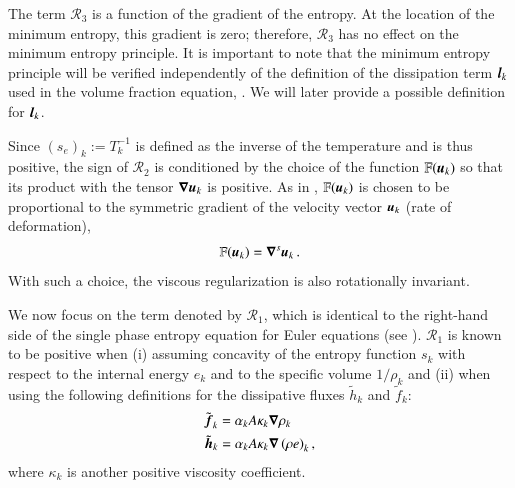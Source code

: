 \documentclass[preprint,10pt]{elsarticle}
\begin{document}
The term ${\mathcal{R}_3}$ is a function of the gradient of the entropy.  
At the location of the minimum entropy, this gradient is zero; therefore, $\mathcal{R}_3$ 
has no effect on the minimum entropy principle. It is important to note that the minimum entropy principle will be verified
independently of the definition of the dissipation term $\boldsymbol l_k$ used in the volume fraction
equation, . We will later provide a possible definition for $\boldsymbol l_k$.

Since $(s_e)_k:=T_k^{-1}$ is defined as the inverse of the temperature and is thus positive, the sign of $\mathcal{R}_2$ is 
conditioned by the choice of the function $\mathbb{F}(\boldsymbol u_k)$ so that its product with the tensor $\boldsymbol\nabla \boldsymbol u_k$ is 
positive. As in \cite{jlg, Marco_paper_low_mach}, $\mathbb{F}(\boldsymbol u_k)$ is chosen to be proportional to the symmetric 
gradient of the velocity vector $\boldsymbol u_k$ (rate of deformation),
\begin{equation}
\mathbb{F}(\boldsymbol u_k) = \boldsymbol\nabla^s \boldsymbol u_k \,.
\end{equation}
With such a choice, the viscous regularization is also rotationally invariant.

We now focus on the term denoted by $\mathcal{R}_1$, which is identical to the right-hand side of the single phase entropy 
equation for Euler equations (see \cite{jlg, Marco_paper_low_mach}). $\mathcal{R}_1$ is known to be positive when 
(i) assuming concavity of the entropy function $s_k$ with respect to the internal energy $e_k$ and to the specific 
volume $1 / \rho_k$ and (ii) when using the following definitions for the dissipative fluxes $\tilde{h}_k$ and $\tilde{f}_k$:
%
\begin{subequations} \label{eq:def_visc}
\begin{align}
&\tilde{\boldsymbol f}_k = \alpha_k A \kappa_k \boldsymbol\nabla \rho_k \\
&\tilde{\boldsymbol h}_k = \alpha_k A \kappa_k \boldsymbol\nabla \left( \rho e \right)_k,
\end{align}
\end{subequations}
%  
where $\kappa_k$ is another positive viscosity coefficient. 
\end{document}
